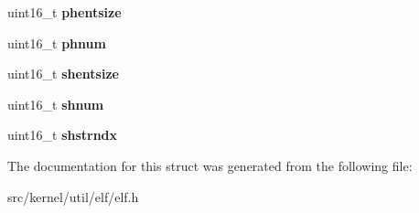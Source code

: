 \begin{DoxyCompactItemize}
uint16\+\_\+t {\bfseries phentsize}
\item 
\mbox{\label{structelf__header_a2591f2be783223d4d1b813d581b5b1f3}} 
uint16\+\_\+t {\bfseries phnum}
\item 
\mbox{\label{structelf__header_ad4f8d829159ca4699f78a73f40394871}} 
uint16\+\_\+t {\bfseries shentsize}
\item 
\mbox{\label{structelf__header_afb573fec3cb525fa8e10ea3e169c698e}} 
uint16\+\_\+t {\bfseries shnum}
\item 
\mbox{\label{structelf__header_a4d5fa9616e0e9b0b628e85351fb57777}} 
uint16\+\_\+t {\bfseries shstrndx}
\end{DoxyCompactItemize}


The documentation for this struct was generated from the following file\+:\begin{DoxyCompactItemize}
\item 
src/kernel/util/elf/elf.\+h\end{DoxyCompactItemize}
